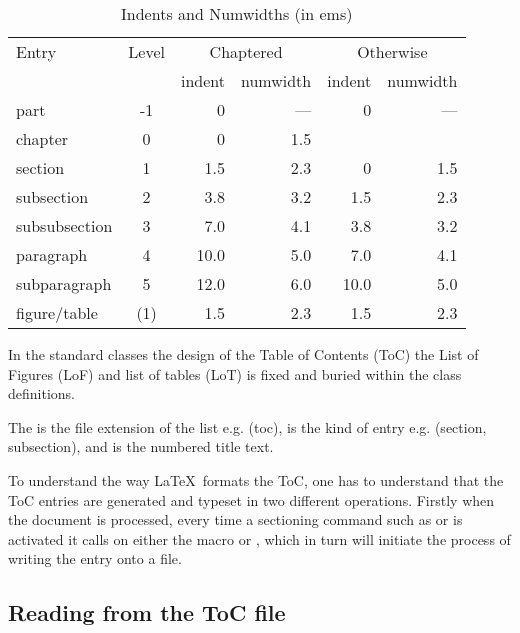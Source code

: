  \begin{table}
 \centering
 \caption[Indents and Numwidths]{Indents and Numwidths (in ems)} \label{tab:indents}
 \begin{tabular}{lcrrrr} \hline
 Entry & Level & \multicolumn{2}{c}{Chaptered} & \multicolumn{2}{c}{Otherwise} \\
       &       & indent & numwidth & indent & numwidth \\ \hline
 part          & -1 & 0    & --- & 0    & --- \\
 chapter       & 0  & 0    & 1.5 &      &     \\
 section       & 1  & 1.5  & 2.3 & 0    & 1.5 \\
 subsection    & 2  & 3.8  & 3.2 & 1.5  & 2.3 \\
 subsubsection & 3  & 7.0  & 4.1 & 3.8  & 3.2 \\
 paragraph     & 4  & 10.0 & 5.0 & 7.0  & 4.1 \\
 subparagraph  & 5  & 12.0 & 6.0 & 10.0 & 5.0 \\
 figure/table  & (1) & 1.5 & 2.3 & 1.5  & 2.3 \\ \hline
 \end{tabular}
 \end{table}

In the standard classes the design of the Table of Contents (ToC) the List of Figures (LoF) and list of tables (LoT) is fixed and buried within the class definitions.

\begin{docCommands}
 {  } {}
The  is the file extension of the list e.g. (toc),  is the kind of entry e.g. (section, subsection), and  is the numbered title text.



\end{docCommands}

To understand the way \LaTeX\ formats the ToC, one has to understand that the ToC entries are generated and typeset in two different operations. Firstly when the document is processed, every time a sectioning command such as  or  is activated it calls on either the macro  or , which in turn will initiate the process of writing the entry onto a file.


\subsection{Reading from the ToC file}

